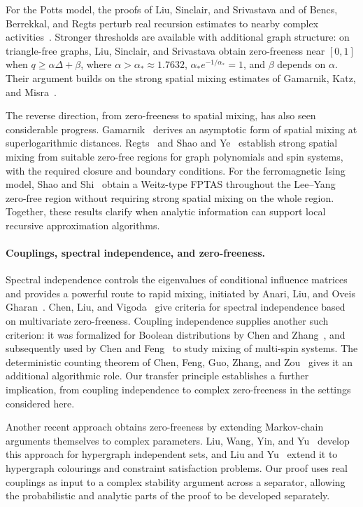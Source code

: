 \documentclass[11pt,reqno]{article}
\theoremstyle{plain}
\theoremstyle{definition}
\theoremstyle{remark}
\theoremstyle{definition}
\theoremstyle{remark}
\newcommand{\Deg}{\Delta}                        %
\begin{document}
For the Potts model, the proofs of Liu, Sinclair, and Srivastava and of
Bencs, Berrekkal, and Regts perturb real recursion estimates to nearby
complex activities~\cite{LiuSinclairSrivastava2025,BencsBerrekkalRegts2026}.
Stronger thresholds are available with additional graph structure:
on triangle-free graphs, Liu, Sinclair, and Srivastava obtain
zero-freeness near \([0,1]\) when \(q\ge\alpha\Deg+\beta\), where
\(\alpha>\alpha_*\approx1.7632\), \(\alpha_*e^{-1/\alpha_*}=1\),
and \(\beta\) depends on \(\alpha\).  Their argument builds on the
strong spatial mixing estimates of Gamarnik, Katz, and
Misra~\cite{GamarnikKatzMisra2015}.

The reverse direction, from zero-freeness to spatial mixing, has also
seen considerable progress.  Gamarnik~\cite{Gamarnik2023} derives an
asymptotic form of spatial mixing at superlogarithmic distances.
Regts~\cite{Regts2023} and Shao and Ye~\cite{ShaoYe2024} establish
strong spatial mixing from suitable zero-free regions for graph
polynomials and spin systems, with the required closure and boundary
conditions.  For the ferromagnetic Ising model, Shao and
Shi~\cite{ShaoShi2026} obtain a Weitz-type FPTAS throughout the
Lee--Yang zero-free region without requiring strong spatial mixing on
the whole region.  Together, these results clarify when analytic
information can support local recursive approximation algorithms.

\paragraph{Couplings, spectral independence, and zero-freeness.}
Spectral independence controls the eigenvalues of conditional influence
matrices and provides a powerful route to rapid mixing, initiated by
Anari, Liu, and Oveis Gharan~\cite{AnariLiuOveisGharan2020}.
Chen, Liu, and Vigoda~\cite{ChenLiuVigoda2024} give criteria for
spectral independence based on multivariate zero-freeness.
Coupling independence supplies another such criterion: it was
formalized for Boolean distributions by Chen and
Zhang~\cite{ChenZhang2023}, and subsequently used by Chen and
Feng~\cite{ChenFeng2024} to study mixing of multi-spin systems.
The deterministic counting theorem of Chen, Feng, Guo, Zhang, and
Zou~\cite{CFFGZZ2024} gives it an additional algorithmic role.
Our transfer principle establishes a further implication, from coupling
independence to complex zero-freeness in the settings considered here.

Another recent approach obtains zero-freeness by extending Markov-chain
arguments themselves to complex parameters.  Liu, Wang, Yin, and
Yu~\cite{LiuWangYinYu2025} develop this approach for hypergraph
independent sets, and Liu and Yu~\cite{LiuYu2026} extend it to
hypergraph colourings and constraint satisfaction problems.
Our proof uses real couplings as input to a complex stability argument
across a separator, allowing the probabilistic and analytic parts of the
proof to be developed separately.
\end{document}
